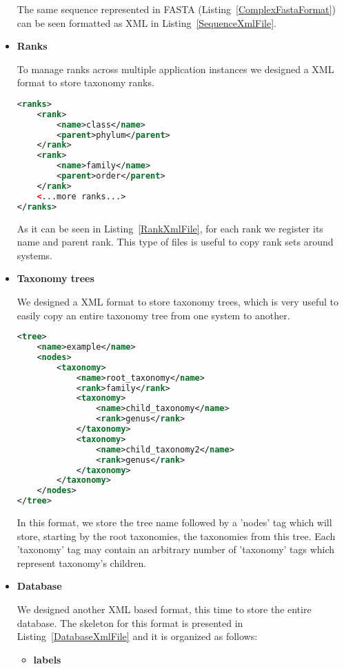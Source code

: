 \begin{itemize}
The same sequence represented in FASTA (Listing~\ref{ComplexFastaFormat}) can be seen formatted as XML in Listing~\ref{SequenceXmlFile}.
  
  \item \textbf{Ranks}
  
  To manage ranks across multiple application instances we designed a XML format to store taxonomy ranks.
  
\begin{lstlisting}[float, language=xml, frame=single, label=RankXmlFile, caption={An example Rank XML file.}]
<ranks>
	<rank>
		<name>class</name>
		<parent>phylum</parent>
	</rank>
	<rank>
		<name>family</name>
		<parent>order</parent>
	</rank>
	<...more ranks...>
</ranks>
\end{lstlisting}
  
  As it can be seen in Listing~\ref{RankXmlFile}, for each rank we register its name and parent rank. This type of files is useful to copy rank sets around systems.
  
  \item \textbf{Taxonomy trees}
  
  We designed a XML format to store taxonomy trees, which is very useful to easily copy an entire taxonomy tree from one system to another.
  
\begin{lstlisting}[float, language=xml, frame=single, label=TaxonomyTreeXmlFile, caption={An example Taxonomy tree XML file.}]
<tree>
	<name>example</name>
	<nodes>
		<taxonomy>
			<name>root_taxonomy</name>
			<rank>family</rank>
			<taxonomy>
				<name>child_taxonomy</name>
				<rank>genus</rank>
			</taxonomy>
			<taxonomy>
				<name>child_taxonomy2</name>
				<rank>genus</rank>
			</taxonomy>
		</taxonomy>
	</nodes>
</tree>
\end{lstlisting}
  
  In this format, we store the tree name followed by a 'nodes' tag which will store, starting by the root taxonomies, the taxonomies from this tree. Each 'taxonomy' tag may contain an arbitrary number of 'taxonomy' tags which represent taxonomy's children.
  
  \item \textbf{Database}
  
  We designed another XML based format, this time to store the entire database. The skeleton for this format is presented in Listing~\ref{DatabaseXmlFile} and it is organized as follows:
  
  \begin{itemize}
    \item \textbf{labels}
    

\end{itemize}
\end{itemize}
